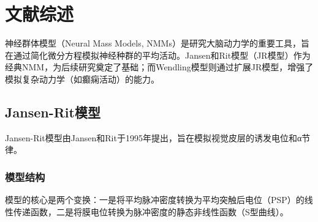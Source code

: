 
\section{文献综述}

神经群体模型（Neural Mass Models, NMMs）是研究大脑动力学的重要工具，旨在通过简化微分方程模拟神经种群的平均活动。Jansen和Rit模型（JR模型）作为经典NMM，为后续研究奠定了基础；而Wendling模型则通过扩展JR模型，增强了模拟复杂动力学（如癫痫活动）的能力。

\subsection{Jansen-Rit模型}

Jansen-Rit模型由Jansen和Rit于1995年提出，旨在模拟视觉皮层的诱发电位和α节律。

\subsubsection{模型结构}

模型的核心是两个变换：一是将平均脉冲密度转换为平均突触后电位（PSP）的线性传递函数，二是将膜电位转换为脉冲密度的静态非线性函数（S型曲线）。
